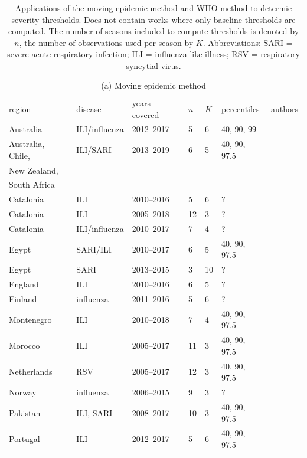 \documentclass{article}
\begin{document}
\begin{table}
\caption{Applications of the moving epidemic method and WHO method to determie severity thresholds. Does not contain works where only baseline thresholds are computed. The number of seasons included to compute thresholds is denoted by $n$, the number of observations used per season by $K$. Abbreviations: SARI = severe acute respiratory infection; ILI = influenza-like illness; RSV = respiratory syncytial virus.}
\label{tab:literature}
\center
\footnotesize
\begin{tabular}{l l l l l l l}
\multicolumn{7}{c}{(a) Moving epidemic method}\\ \\

\toprule
region & disease & years covered & $n$ & $K$ & percentiles & authors\\
\midrule
Australia & ILI/influenza & 2012--2017 & 5 & 6 & 40, 90, 99 & \cite{Vette2018}\\
Australia, Chile, & ILI/SARI & 2013--2019 & 6 & 5 & 40, 90, 97.5 & \cite{Sullivan2019}\\
New Zealand,\\
South Africa\\
Catalonia & ILI & 2010--2016 & 5 & 6 & ? & \cite{Basile2018}\\
Catalonia & ILI & 2005--2018 & 12 & 3 & ? & \cite{Basile2019}\\
Catalonia & ILI/influenza & 2010--2017 & 7 & 4 & ? & \cite{Torner2019}\\
Egypt & SARI/ILI & 2010--2017 & 6 & 5 & 40, 90, 97.5 & \cite{AbdElGawad2020}\\
Egypt & SARI & 2013--2015 & 3 & 10 & ? & \cite{Elhakim2019}\\
England & ILI & 2010--2016 & 6 & 5 & ? & \cite{Wagner2018}\\
Finland & influenza & 2011--2016 & 5 & 6 & ? & \cite{Pesaelae2019}\\
Montenegro & ILI & 2010--2018 & 7 & 4 & 40, 90, 97.5 & \cite{Rakocevic2019}\\
Morocco & ILI & 2005--2017 & 11 & 3 & 40, 90, 97.5 & \cite{Rguig2020}\\
Netherlands & RSV & 2005--2017 & 12 & 3 & 40, 90, 97.5 & \cite{Vos2019}\\
Norway & influenza & 2006--2015 & 9 & 3 & ? & \cite{Benedetti2019}\\
Pakistan & ILI, SARI & 2008--2017 & 10 & 3 & 40, 90, 97.5 & \cite{Nisar2020}\\
Portugal & ILI & 2012--2017 & 5 & 6 & 40, 90, 97.5 & \cite{Pascoa2018}\\

\end{tabular}
\end{table}
\end{document}
